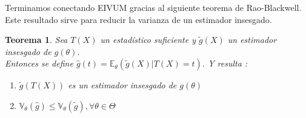 \documentclass[10pt]{article}
\theoremstyle{plain}
\newtheorem{teo}{Teorema}
\theoremstyle{definition}
\begin{document}
Terminamos conectando EIVUM gracias al siguiente teorema de Rao-Blackwell. Este resultado sirve para reducir la varianza de un estimador insesgado.

\begin{teo}
Sea $T(X)$ un estadístico suficiente y $\tilde{g}(X)$ un estimador insesgado de $g(\theta)$.\\
Entonces se define $\hat{g}(t) = \mathbb{E}_{\theta}(\tilde{g}(X) | T(X) = t)$. Y resulta :
\begin{enumerate}
\item $\tilde{g}(T(X))$ es un estimador insesgado de $g(\theta)$
\item $\mathbb{V}_{\theta}(\hat{g}) \le \mathbb{V}_{\theta}(\tilde{g}), \forall \theta \in \Theta$
\end{enumerate}
\end{teo}
\end{document}
